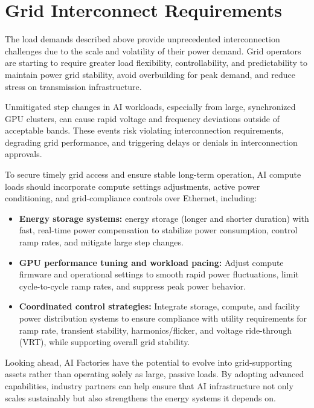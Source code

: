 \section{Grid Interconnect Requirements}

The load demands described above provide unprecedented interconnection challenges due to the scale and volatility of their power demand. Grid operators are starting to require greater load flexibility, controllability, and predictability to maintain power grid stability, avoid overbuilding for peak demand, and reduce stress on transmission infrastructure.

Unmitigated step changes in AI workloads, especially from large, synchronized GPU clusters, can cause rapid voltage and frequency deviations outside of acceptable bands. These events risk violating interconnection requirements, degrading grid performance, and triggering delays or denials in interconnection approvals.

To secure timely grid access and ensure stable long-term operation, AI compute loads should incorporate compute settings adjustments, active power conditioning, and grid-compliance controls over Ethernet, including:

\begin{itemize}
\item \textbf{Energy storage systems:} energy storage (longer and shorter duration) with fast, real-time power compensation to stabilize power consumption, control ramp rates, and mitigate large step changes.

\item \textbf{GPU performance tuning and workload pacing:} Adjust compute firmware and operational settings to smooth rapid power fluctuations, limit cycle-to-cycle ramp rates, and suppress peak power behavior.

\item \textbf{Coordinated control strategies:} Integrate storage, compute, and facility power distribution systems to ensure compliance with utility requirements for ramp rate, transient stability, harmonics/flicker, and voltage ride-through (VRT), while supporting overall grid stability.
\end{itemize}

Looking ahead, AI Factories have the potential to evolve into grid-supporting assets rather than operating solely as large, passive loads. By adopting advanced capabilities, industry partners can help ensure that AI infrastructure not only scales sustainably but also strengthens the energy systems it depends on.

